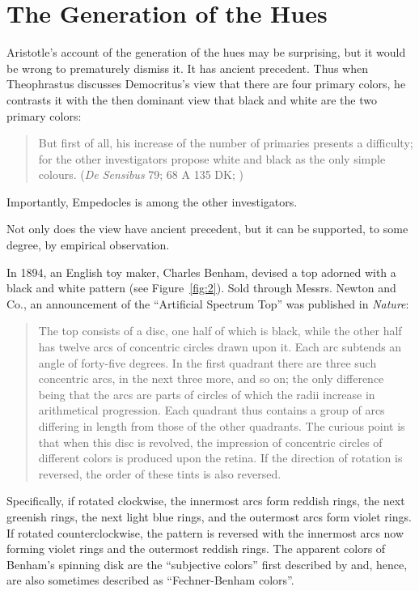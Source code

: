 \section{The Generation of the Hues} %
\label{sec:the_generation_of_the_hues}

Aristotle's account of the generation of the hues may be surprising, but it would be wrong to prematurely dismiss it. It has ancient precedent. Thus when Theophrastus discusses Democritus's view that there are four primary colors, he contrasts it with the then dominant view that black and white are the two primary colors:
\begin{quote}
    But first of all, his increase of the number of primaries presents a difficulty; for the other investigators propose white and black as the only simple colours. (\emph{De Sensibus} 79; 68 A 135 DK; \citealt{Stratton:1917vn})
\end{quote}
Importantly, Empedocles is among the other investigators.

Not only does the view have ancient precedent, but it can be supported, to some degree, by empirical observation. 

In 1894, an English toy maker, Charles Benham, devised a top adorned with a black and white pattern (see Figure~\ref{fig:2}). Sold through Messrs. Newton and Co., an announcement of the ``Artificial Spectrum Top'' was published in \emph{Nature}:
	\begin{quote}
		The top consists of a disc, one half of which is black, while the other half has twelve arcs of concentric circles drawn upon it. Each arc subtends an angle of forty-five degrees. In the first quadrant there are three such concentric arcs, in the next three more, and so on; the only difference being that the arcs are parts of circles of which the radii increase in arithmetical progression. Each quadrant thus contains a group of arcs differing in length from those of the other quadrants. The curious point is that when this disc is revolved, the impression of concentric circles of different colors is produced upon the retina. If the direction of rotation is reversed, the order of these tints is also reversed. \citep{Benham:1894kx}
	\end{quote}
Specifically, if rotated clockwise, the innermost arcs form reddish rings, the next greenish rings, the next light blue rings, and the outermost arcs form violet rings. If rotated counterclockwise, the pattern is reversed with the innermost arcs now forming violet rings and the outermost reddish rings. The apparent colors of Benham's spinning disk are the ``subjective colors'' first described by \citep{Fechner:1838vn} and, hence, are also sometimes described as ``Fechner-Benham colors''.


